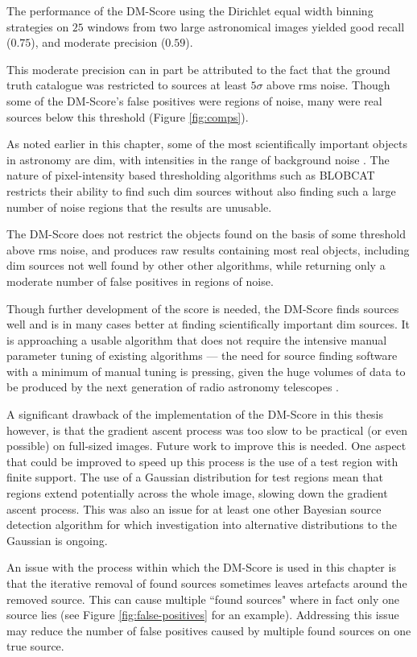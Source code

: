 The performance of the DM-Score using the Dirichlet equal width binning strategies on $25$ windows from two large astronomical images yielded good recall ($0.75$), and moderate precision ($0.59$).

This moderate precision can in part be attributed to the fact that the ground truth catalogue was restricted to sources at least $5 \sigma$ above rms noise. Though some of the DM-Score's false positives were regions of noise, many were real sources below this threshold (Figure \ref{fig:comps}).

As noted earlier in this chapter, some of the most scientifically important objects in astronomy are dim, with intensities in the range of background noise \cite{norris2011emu}. The nature of pixel-intensity based thresholding algorithms such as BLOBCAT restricts their ability to find such dim sources without also finding such a large number of noise regions that the results are unusable.

The DM-Score does not restrict the objects found on the basis of some threshold above rms noise, and produces raw results containing most real objects, including dim sources not well found by other other algorithms, while returning only a moderate number of false positives in regions of noise.

Though further development of the score is needed, the DM-Score finds sources well and is in many cases better at finding scientifically important dim sources. It is approaching a usable algorithm that does not require the intensive manual parameter tuning of existing algorithms --- the need for source finding software with a minimum of manual tuning is pressing, given the huge volumes of data to be produced by the next generation of radio astronomy telescopes \cite{norris2011emu}.

A significant drawback of the implementation of the DM-Score in this thesis however, is that the gradient ascent process was too slow to be practical (or even possible) on full-sized images. Future work to improve this is needed. One aspect that could be improved to speed up this process is the use of a test region with finite support. The use of a Gaussian distribution for test regions mean that regions extend potentially across the whole image, slowing down the gradient ascent process. This was also an issue for at least one other Bayesian source detection algorithm \cite{feroz2008multimodal} for which investigation into alternative distributions to the Gaussian is ongoing. 

An issue with the process within which the DM-Score is used in this chapter is that the iterative removal of found sources sometimes leaves artefacts around the removed source. This can cause multiple ``found sources" where in fact only one source lies (see Figure \ref{fig:false-positives} for an example). Addressing this issue may reduce the number of false positives caused by multiple found sources on one true source.

